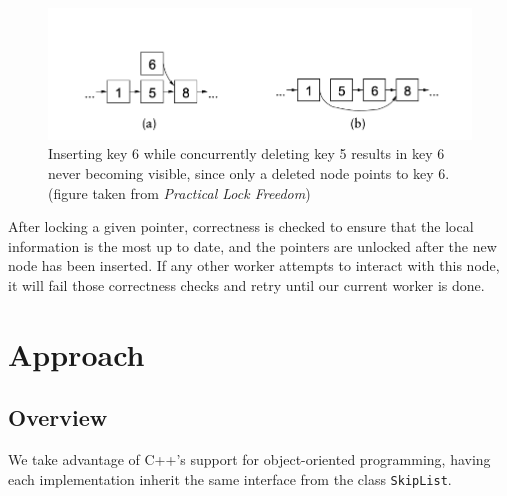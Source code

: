 \documentclass[11pt]{article}
\newcommand{\ttt}[1]{\texttt{#1}}
\begin{document}
\begin{figure}[h!]
\begin{center}
\includegraphics[width=5in]{Screen Shot 2022-05-05 at 5.58.34 PM.png}
\end{center}
\caption{Inserting key 6 while concurrently deleting key 5 results in key 6 never becoming visible, since only a deleted node points to key 6. (figure taken from \textit{Practical Lock Freedom})\cite{fraser2004practical}}
\end{figure}

After locking a given pointer, correctness is checked to ensure that the local information is the most up to date, and the pointers are unlocked after the new node has been inserted. If any other worker attempts to interact with this node, it will fail those correctness checks and retry until our current worker is done.



\pagebreak
\section{Approach}
\subsection{Overview}
We take advantage of C++'s support for object-oriented programming, having each implementation inherit the same interface from the class \ttt{SkipList}.
\end{document}
